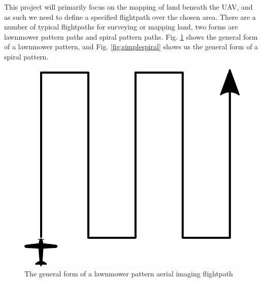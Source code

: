 This project will primarily focus on the mapping of land beneath the UAV, and as such we need to define a specified flightpath over the chosen area. There are a number of typical flightpaths for surveying or mapping land, two forms are lawnmower pattern paths and spiral pattern paths. Fig. \ref{fig:simplelawnmower} shows the general form of a lawnmower pattern, and Fig. \ref{fig:simplespiral} shows us the general form of a spiral pattern.

\begin{figure}[htbp!] 
\centering    
\includegraphics[width=0.3\textheight]{SimpleLawnmower}
\caption[Simple Lawnmower Pattern]{The general form of a lawnmower pattern aerial imaging flightpath}
\label{fig:simplelawnmower}
\end{figure}

